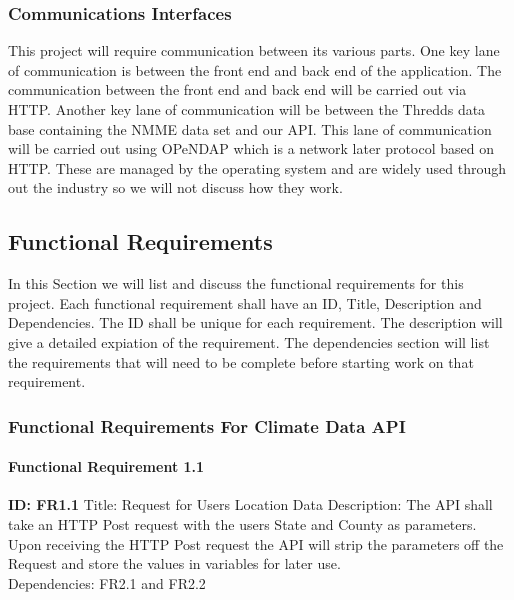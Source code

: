 \documentclass[onecolumn, draftclsnofoot,10pt, compsoc]{article}
\begin{document}
        \subsubsection{Communications Interfaces}
					This project will require communication between its various parts. One key lane of communication is between the front end and back end of the application. The communication between the front end and back end will be carried out via HTTP. Another key lane of communication will be between the Thredds data base containing the NMME data set and our API. This lane of communication will be carried out using OPeNDAP which is a network later protocol based on HTTP. These are managed by the operating system and are widely used through out the industry so we will not discuss how they work.\\


		\subsection{Functional Requirements}
			In this Section we will list and discuss the functional requirements for this project. Each functional requirement shall have an ID, Title, Description and Dependencies. The ID shall be unique for each requirement. The description will give a detailed expiation of the requirement. The dependencies section will list the requirements that will need to be complete before starting work on that requirement.\\


			\subsubsection{Functional Requirements For Climate Data API}
					\paragraph{Functional Requirement 1.1}
						\textbf{ID: FR1.1} \hfill \break
						Title: Request for Users Location Data\hfill \break
						Description: The API shall take an HTTP Post request with the users State and County as parameters. Upon receiving the HTTP Post request the API will strip the parameters off the Request and store the values in variables for later use.\\
						Dependencies: FR2.1 and FR2.2\hfill \break
\end{document}
